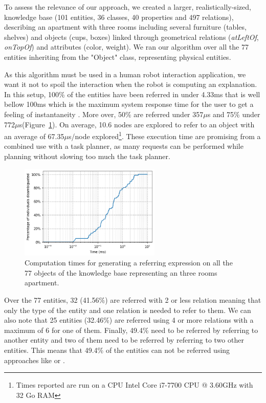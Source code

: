 \documentclass[a4paper,11pt,twoside]{StyleThese}
\begin{document}
To assess the relevance of our approach, we created a larger, realistically-sized, knowledge base (101 entities, 36 classes, 40 properties and 497 relations), describing an apartment with three rooms including several furniture (tables, shelves) and objects (cups, boxes) linked through geometrical relations (\textit{atLeftOf}, \textit{onTopOf}) and attributes (color, weight).
We ran our algorithm over all the 77 entities inheriting from the "Object" class, representing physical entities. 

\newcommand{\us}{$\mu$s\xspace}

As this algorithm must be used in a human robot interaction application, we want it not to spoil the interaction when the robot is computing an explanation. In this setup, 100\% of the entities have been referred in under 4.33ms that is well bellow 100ms which is the maximum system response time for the user to get a feeling of instantaneity \cite{miller1968response}. More over, 50\% are referred under 357\us and 75\% under 772\us (Figure~\ref{fig:scalingup}). On average, 10.6 nodes are explored to refer to an object with an average of 67.35\us/node explored\footnote{Times reported are run on a CPU Intel Core i7-7700 CPU @ 3.60GHz with 32 Go RAM}. These execution time are promising from a combined use with a task planner, as many requests can be performed while planning without slowing too much the task planner.

\begin{figure}[hbtp]
\centering
\includegraphics[width=0.6\textwidth]{figures/chapter3/scalingupREG.png}
\caption{Computation times for generating a referring expression on all the 77 objects of the knowledge base representing an three rooms apartment.}
\label{fig:scalingup}
\end{figure}

Over the 77 entities, 32 (41.56\%) are referred with 2 or less relation meaning that only the type of the entity and one relation is needed to refer to them. We can also note that 25 entities (32.46\%) are referred using 4 or more relations with a maximum of 6 for one of them. Finally, 49.4\% need to be referred by referring to another entity and two of them need to be referred by referring to two other entities. This means that 49.4\% of the entities can not be referred using approaches like \cite{ros2010one} or \cite{dale1995computational}.
\end{document}
